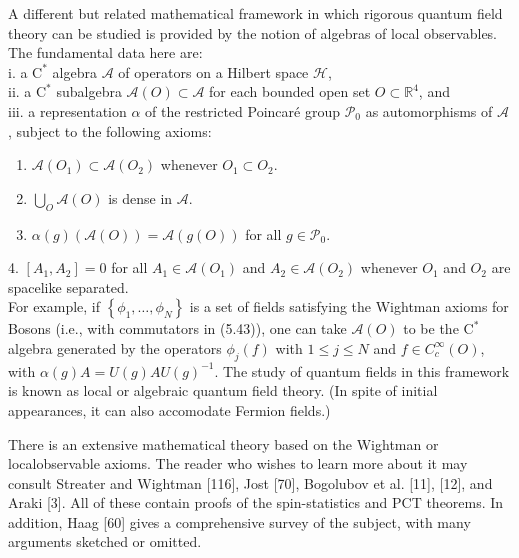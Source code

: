 \documentclass[10pt, letterpaper]{article}
\begin{document}
A different but related mathematical framework in which rigorous quantum field theory can be studied is provided by the notion of algebras of local observables. The fundamental data here are:\\
i. a $\mathrm{C}^{*}$ algebra $\mathcal{A}$ of operators on a Hilbert space $\mathcal{H}$,\\
ii. a $\mathrm{C}^{*}$ subalgebra $\mathcal{A}(O) \subset \mathcal{A}$ for each bounded open set $O \subset \mathbb{R}^{4}$, and\\
iii. a representation $\alpha$ of the restricted Poincaré group $\mathcal{P}_{0}$ as automorphisms of $\mathcal{A}$, subject to the following axioms:

\begin{enumerate}
  \item $\mathcal{A}\left(O_{1}\right) \subset \mathcal{A}\left(O_{2}\right)$ whenever $O_{1} \subset O_{2}$.
  \item $\bigcup_{O} \mathcal{A}(O)$ is dense in $\mathcal{A}$.
  \item $\alpha(g)(\mathcal{A}(O))=\mathcal{A}(g(O))$ for all $g \in \mathcal{P}_{0}$.
\end{enumerate}

4. $\left[A_{1}, A_{2}\right]=0$ for all $A_{1} \in \mathcal{A}\left(O_{1}\right)$ and $A_{2} \in \mathcal{A}\left(O_{2}\right)$ whenever $O_{1}$ and $O_{2}$ are spacelike separated.\\
For example, if $\left\{\phi_{1}, \ldots, \phi_{N}\right\}$ is a set of fields satisfying the Wightman axioms for Bosons (i.e., with commutators in (5.43)), one can take $\mathcal{A}(O)$ to be the $\mathrm{C}^{*}$ algebra generated by the operators $\phi_{j}(f)$ with $1 \leq j \leq N$ and $f \in C_{c}^{\infty}(O)$, with $\alpha(g) A=U(g) A U(g)^{-1}$. The study of quantum fields in this framework is known as local or algebraic quantum field theory. (In spite of initial appearances, it can also accomodate Fermion fields.)

There is an extensive mathematical theory based on the Wightman or localobservable axioms. The reader who wishes to learn more about it may consult Streater and Wightman [116], Jost [70], Bogolubov et al. [11], [12], and Araki [3]. All of these contain proofs of the spin-statistics and PCT theorems. In addition, Haag [60] gives a comprehensive survey of the subject, with many arguments sketched or omitted.
\end{document}
